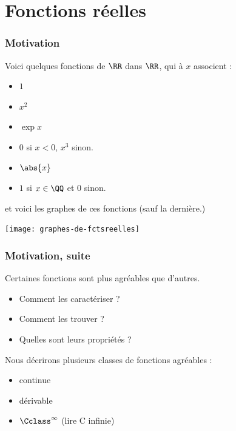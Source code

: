 \section{Fonctions réelles}
\begin{frame} %
  \frametitle{Motivation}
  \begin{example}
    \begin{minipage}{0.49\linewidth}
      Voici quelques fonctions de \(\RR\) dans \(\RR\), qui à \(x\) associent :
      \begin{itemize}[<+->]
      \item \(1\)
      \item \(x^{2}\)
      \item \(\exp{x}\)
      \item \(0\) si \(x < 0\), \(x^{3}\) sinon.
      \item \(\abs{x}\)
      \item \(1\) si \(x \in \QQ\) et \(0\) sinon.
      \end{itemize}\pause
      et voici les graphes de ces fonctions (sauf la dernière.)
    \end{minipage}\pause
    \begin{minipage}{0.49\linewidth}
      \begin{center}
        \texttt{[image: graphes-de-fctsreelles]}
      \end{center}
    \end{minipage}
  \end{example}
\end{frame}
\begin{frame}%
  \frametitle{Motivation, suite}
  Certaines fonctions sont plus agréables que d'autres.
  \begin{itemize}[<+->]
  \item Comment les caractériser ?
  \item Comment les trouver ?
  \item Quelles sont leurs propriétés ?
  \end{itemize}\pause
  Nous décrirons plusieurs classes de fonctions \og agréables\fg{} :
  \begin{itemize}[<+->]
  \item continue
  \item dérivable
  \item \(\Cclass^{\infty}\) (lire \og C infinie\fg{})
  \end{itemize}
\end{frame}

